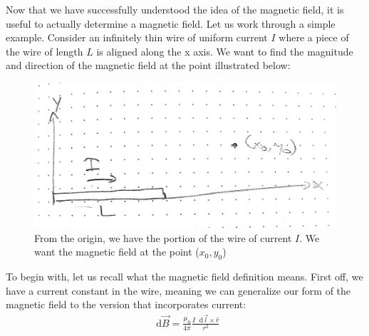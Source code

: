 \documentclass{article}
\newcommand*\dif{\mathop{}\!\mathrm{d}}
\begin{document}
Now that we have successfully understood the idea of the magnetic field, it is useful to actually determine a magnetic field. Let us work through a simple example. Consider an infinitely thin wire of uniform current $I$ where a piece of the wire of length $L$ is aligned along the x axis. We want to find the magnitude and direction of the magnetic field at the point illustrated below:

\begin{figure}[ht]
\center
\includegraphics[width=.3\textwidth]{images/Week3pic2.jpg}
\caption{From the origin, we have the portion of the wire of current $I$. We want the magnetic field at the point ($x_0,y_0$)}
\end{figure}

To begin with, let us recall what the magnetic field definition means. First off, we have a current constant in the wire, meaning we can generalize our form of the magnetic field to the version that incorporates current: 
\begin{align*}
\dif \vec{B} = \frac{\mu_0}{4\pi}\frac{I\dif\vec{l}\times\hat{r}}{r^2}
\end{align*}
\end{document}
